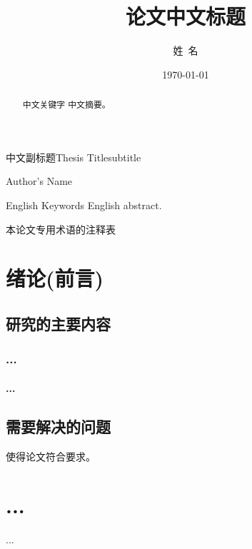 \documentclass[unicode,bachelor]{seuthesis}
\begin{document}
\title{论文中文标题}{中文副标题}{Thesis Title}{subtitle}
\author{姓~名}{Author's Name}
\address{河海院2楼}
\date{\today}
\maketitle

\begin{abstract}{中文关键字}
  中文摘要。
\end{abstract}

\begin{englishabstract}{English Keywords}
  English abstract.
\end{englishabstract}

\begin{terminology}
  本论文专用术语的注释表
\end{terminology}

\begin{Main} %

\chapter{绪论(前言)}
\section{研究的主要内容}
\subsection{...}
\subsubsection{...}
\section{需要解决的问题}
使得论文符合要求\cite{seugs:standard}。

\chapter{...}
...

\end{Main} %
\end{document}
